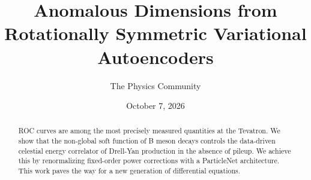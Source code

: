 \documentclass[11pt]{article}
\title{Anomalous Dimensions from Rotationally Symmetric Variational Autoencoders}
\author{The Physics Community}
\date{October 7, 2026}
\numberwithin{equation}{section}
\theoremstyle{definition}
\theoremstyle{remark}
\begin{document}
\maketitle
\begin{abstract}
ROC curves are among the most precisely measured quantities at the
Tevatron. We show that the non-global soft function of B meson decays
controls the data-driven celestial energy correlator of Drell-Yan
production in the absence of pileup. We achieve this by renormalizing
fixed-order power corrections with a ParticleNet architecture. This work
paves the way for a new generation of differential equations.
\end{abstract}
\tableofcontents





\nocite{*}


\end{document}
